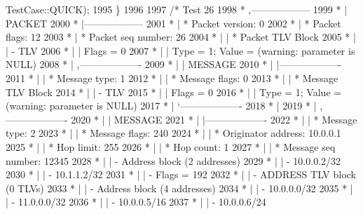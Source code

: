 \begin{DoxyCode}
      TestCase::QUICK);
1995   \}
1996 
1997   \textcolor{comment}{/* Test 26}
1998 \textcolor{comment}{         * ,------------------}
1999 \textcolor{comment}{         * |  PACKET}
2000 \textcolor{comment}{         * |------------------}
2001 \textcolor{comment}{         * | * Packet version:    0}
2002 \textcolor{comment}{         * | * Packet flags:  12}
2003 \textcolor{comment}{         * | * Packet seq number: 26}
2004 \textcolor{comment}{         * |    | * Packet TLV Block}
2005 \textcolor{comment}{         * |    |     - TLV}
2006 \textcolor{comment}{         * |    |         Flags = 0}
2007 \textcolor{comment}{         * |    |         Type = 1; Value = (warning: parameter is NULL)}
2008 \textcolor{comment}{         * |    ,-------------------}
2009 \textcolor{comment}{         * |    |  MESSAGE}
2010 \textcolor{comment}{         * |    |-------------------}
2011 \textcolor{comment}{         * |    | * Message type:       1}
2012 \textcolor{comment}{         * |    | * Message flags:  0}
2013 \textcolor{comment}{         * |    | * Message TLV Block}
2014 \textcolor{comment}{         * |    |     - TLV}
2015 \textcolor{comment}{         * |    |         Flags = 0}
2016 \textcolor{comment}{         * |    |         Type = 1; Value = (warning: parameter is NULL)}
2017 \textcolor{comment}{         * |    `-------------------}
2018 \textcolor{comment}{         * |}
2019 \textcolor{comment}{         * |    ,-------------------}
2020 \textcolor{comment}{         * |    |  MESSAGE}
2021 \textcolor{comment}{         * |    |-------------------}
2022 \textcolor{comment}{         * |    | * Message type:       2}
2023 \textcolor{comment}{         * |    | * Message flags:  240}
2024 \textcolor{comment}{         * |    | * Originator address: 10.0.0.1}
2025 \textcolor{comment}{         * |    | * Hop limit:          255}
2026 \textcolor{comment}{         * |    | * Hop count:          1}
2027 \textcolor{comment}{         * |    | * Message seq number: 12345}
2028 \textcolor{comment}{         * |    | - Address block (2 addresses)}
2029 \textcolor{comment}{         * |    |     - 10.0.0.2/32}
2030 \textcolor{comment}{         * |    |     - 10.1.1.2/32}
2031 \textcolor{comment}{         * |    |     - Flags = 192}
2032 \textcolor{comment}{         * |    | - ADDRESS TLV block (0 TLVs)}
2033 \textcolor{comment}{         * |    | - Address block (4 addresses)}
2034 \textcolor{comment}{         * |    |     - 10.0.0.0/32}
2035 \textcolor{comment}{         * |    |     - 11.0.0.0/32}
2036 \textcolor{comment}{         * |    |     - 10.0.0.5/16}
2037 \textcolor{comment}{         * |    |     - 10.0.0.6/24}

\end{DoxyCode}
